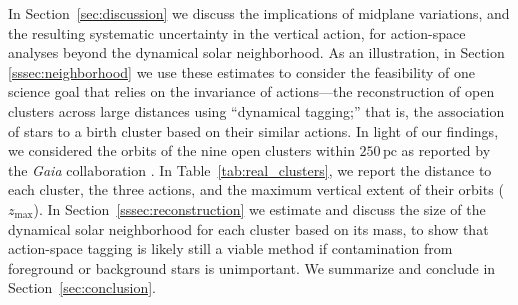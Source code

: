 \documentclass[twocolumn]{aastex62}
\newcommand{\pc}{\text{pc}}
\begin{document}
In Section~\ref{sec:discussion} we discuss the implications of midplane
variations, and the resulting systematic uncertainty in the vertical action,
for action-space analyses beyond the dynamical solar neighborhood. As an
illustration, in Section \ref{sssec:neighborhood} we use these estimates to
consider the feasibility of one science goal that relies on the invariance of
actions---the reconstruction of open clusters across large distances using
``dynamical tagging;'' that is, the association of stars to a birth cluster
based on their similar actions. In light of our findings, we considered the
orbits of the nine open clusters within $250\,\pc$ as reported by the {\em
Gaia} collaboration \citep{2018AA...616A..10G}. In
Table~\ref{tab:real_clusters}, we report the distance to each cluster, the
three actions, and the maximum vertical extent of their orbits
($z_{\text{max}}$). In Section~\ref{sssec:reconstruction} we estimate and
discuss the size of the dynamical solar neighborhood for each cluster based on
its mass, to show that action-space tagging is likely still a viable method if
contamination from foreground or background stars is unimportant. We summarize
and conclude in Section~\ref{sec:conclusion}.
\end{document}
